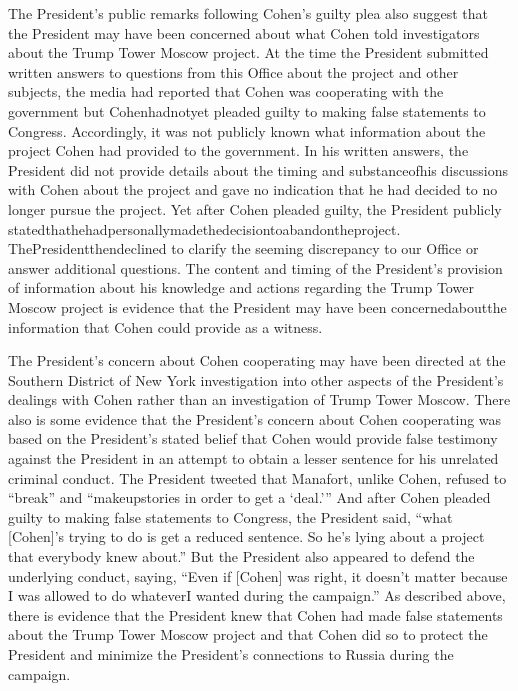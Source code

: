 {The President's public remarks following Cohen's guilty plea also suggest that the President may have been concerned about what Cohen told investigators about the Trump Tower Moscow project. At the time the President submitted written answers to questions from this Office about the project and other subjects, the media had reported that Cohen was cooperating with the government but Cohenhadnotyet pleaded guilty to making false statements to Congress. Accordingly, it was not publicly known what information about the project Cohen had provided to the government. In his written answers, the President did not provide details about the timing and substanceofhis discussions with Cohen about the project and gave no indication that he had decided to no longer pursue the project. Yet after Cohen pleaded guilty, the President publicly statedthathehadpersonallymadethedecisiontoabandontheproject. ThePresidentthendeclined to clarify the seeming discrepancy to our Office or answer additional questions. The content and timing of the President's provision of information about his knowledge and actions regarding the Trump Tower Moscow project is evidence that the President may have been concernedaboutthe
information that Cohen could provide as a witness.

The President's concern about Cohen cooperating may have been directed at the Southern District of New York investigation into other aspects of the President's dealings with Cohen rather than an investigation of Trump Tower Moscow. There also is some evidence that the President's concern about Cohen cooperating was based on the President's stated belief that Cohen would provide false testimony against the President in an attempt to obtain a lesser sentence for his unrelated criminal conduct. The President tweeted that Manafort, unlike Cohen, refused to “break” and “makeupstories in order to get a ‘deal.'” And after Cohen pleaded guilty to making false statements to Congress, the President said, “what [Cohen]'s trying to do is get a reduced sentence. So he's lying about a project that everybody knew about.” But the President also appeared to defend the underlying conduct, saying, “Even if [Cohen] was right, it doesn't matter because I was allowed to do whateverI wanted during the campaign.” As described above, there is evidence that the President knew that Cohen had made false statements about the Trump Tower Moscow project and that Cohen did so to protect the President and minimize the President's connections to Russia during the campaign.

}
